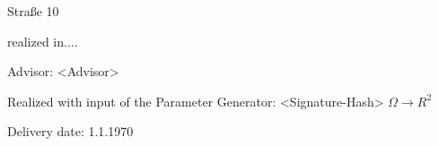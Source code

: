 \vspace*{-6mm}

\begin{large} 
\begin{center}
Straße 10
\end{center}
\end{large} 

\vspace*{-6mm}

\begin{large} 
\begin{center}
realized in....
\end{center}
\end{large} 

\vspace*{5mm}

\begin{large} 
\begin{center}
Advisor: <Advisor>
\end{center}
\end{large} 

\begin{large} 
\begin{center}
Realized with input of the Parameter Generator: <Signature-Hash> $\Omega \longrightarrow R^2$
\end{center}
\end{large} 



\vspace*{-6mm}

\begin{large} 
\begin{center}
Delivery date: 1.1.1970
\end{center}
\end{large} 


\pagestyle{empty} %

